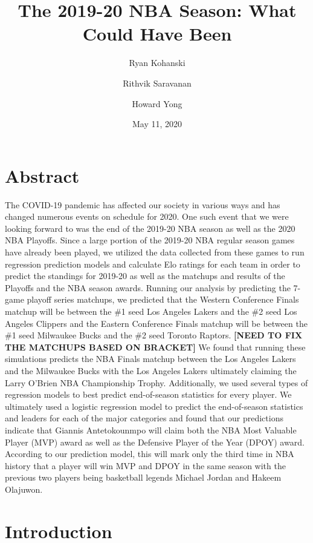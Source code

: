 \documentclass[]{article}
\title{The 2019-20 NBA Season: What Could Have Been}
\author{Ryan Kohanski \and Rithvik Saravanan \and Howard Yong}
\date{May 11, 2020}
\begin{document}
\maketitle

\hypertarget{abstract}{%
\section{Abstract}\label{abstract}}

The COVID-19 pandemic has affected our society in various ways and has
changed numerous events on schedule for 2020. One such event that we
were looking forward to was the end of the 2019-20 NBA season as well as
the 2020 NBA Playoffs. Since a large portion of the 2019-20 NBA regular
season games have already been played, we utilized the data collected
from these games to run regression prediction models and calculate Elo
ratings for each team in order to predict the standings for 2019-20 as
well as the matchups and results of the Playoffs and the NBA season
awards. Running our analysis by predicting the 7-game playoff series
matchups, we predicted that the Western Conference Finals matchup will
be between the \#1 seed Los Angeles Lakers and the \#2 seed Los Angeles
Clippers and the Eastern Conference Finals matchup will be between the
\#1 seed Milwaukee Bucks and the \#2 seed Toronto Raptors.
\textbf{{[}NEED TO FIX THE MATCHUPS BASED ON BRACKET{]}} We found that
running these simulations predicts the NBA Finals matchup between the
Los Angeles Lakers and the Milwaukee Bucks with the Los Angeles Lakers
ultimately claiming the Larry O'Brien NBA Championship Trophy.
Additionally, we used several types of regression models to best predict
end-of-season statistics for every player. We ultimately used a logistic
regression model to predict the end-of-season statistics and leaders for
each of the major categories and found that our predictions indicate
that Giannis Antetokounmpo will claim both the NBA Most Valuable Player
(MVP) award as well as the Defensive Player of the Year (DPOY) award.
According to our prediction model, this will mark only the third time in
NBA history that a player will win MVP and DPOY in the same season with
the previous two players being basketball legends Michael Jordan and
Hakeem Olajuwon.

\hypertarget{introduction}{%
\section{Introduction}\label{introduction}}
\end{document}

